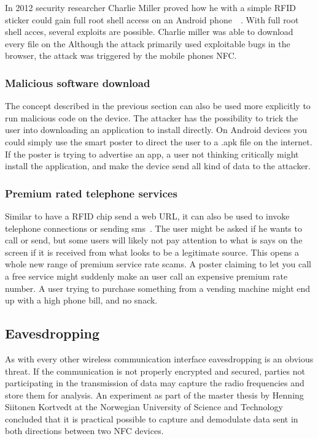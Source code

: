 \documentclass[a4paper,11pt]{article}
\begin{document}
In 2012 security researcher Charlie Miller proved how he with a simple RFID sticker could gain full root shell access on an Android phone~\cite{cmiller}~\cite{cmiller1}. With full root shell acces, several exploits are possible. Charlie miller was able to download every file on the  Although the attack primarily used exploitable bugs in the browser, the attack was triggered by the mobile phones NFC.

\subsubsection{Malicious software download}
The concept described in the previous section can also be used more explicitly to run malicious code on the device. The attacker has the possibility to trick the user into downloading an application to install directly. On Android devices you could simply use the smart poster to direct the user to a .apk file on the internet. If the poster is trying to advertise an app, a user not thinking critically might install the application, and make the device send all kind of data to the attacker.

\subsubsection{Premium rated telephone services}

Similar to have a RFID chip send a web URL, it can also be used to invoke telephone connections or sending sms~\cite{mulliner2009vulnerability}. The user might be asked if he wants to call or send, but some users will likely not pay attention to what is says on the screen if it is received from what looks to be a legitimate source. This opens a whole new range of premium service rate scams. A poster claiming to let you call a free service might suddenly make an user call an expensive premium rate number. A user trying to purchase something from a vending machine might end up with a high phone bill, and no snack.

\subsection{Eavesdropping}
As with every other wireless communication interface eavesdropping is an obvious threat. If the communication is not properly encrypted and secured, parties not participating in the transmission of data may capture the radio frequencies and store them for analysis. An experiment as part of the master thesis by Henning Siitonen Kortvedt at the Norwegian University of Science and Technology concluded that it is practical possible to capture and demodulate data sent in both directions between two NFC devices.~\cite{kortvedt2009eavesdropping}~\cite{kortvedt2009securing}
\end{document}
